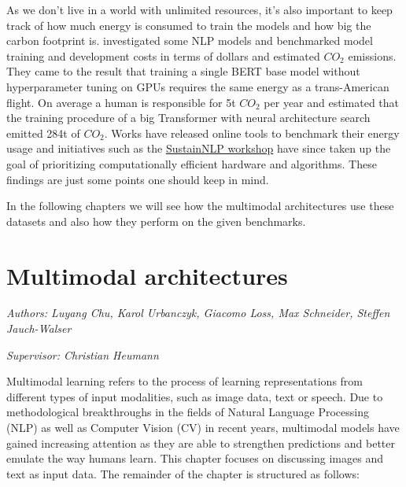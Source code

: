 \documentclass[
]{krantz}
\begin{document}
As we don't live in a world with unlimited resources, it's also important to keep track of how much energy is consumed to train the models and how big the carbon footprint is. \citet{strubell2019energy} investigated some NLP models and benchmarked model training and development costs in terms of dollars and estimated \(CO_2\) emissions. They came to the result that training a single BERT base model without hyperparameter tuning on GPUs requires the same energy as a trans-American flight. On average a human is responsible for 5t \(CO_2\) per year and \citet{strubell2019energy} estimated that the training procedure of a big Transformer with neural architecture search emitted 284t of \(CO_2\). Works \citep[\citet{henderson2020towards}]{lottick2019energy} have released online tools to benchmark their energy usage and initiatives such as the \href{https://sites.google.com/view/sustainlp2020/organization}{SustainNLP workshop} have since taken up the goal of prioritizing computationally efficient hardware and algorithms. These findings are just some points one should keep in mind.

In the following chapters we will see how the multimodal architectures use these datasets and also how they perform on the given benchmarks.

\hypertarget{c02-00-multimodal}{%
\chapter{Multimodal architectures}\label{c02-00-multimodal}}

\emph{Authors: Luyang Chu, Karol Urbanczyk, Giacomo Loss, Max Schneider, Steffen Jauch-Walser}

\emph{Supervisor: Christian Heumann}

Multimodal learning refers to the process of learning representations from different types of input modalities, such as image data, text or speech.
Due to methodological breakthroughs in the fields of Natural Language Processing (NLP) as well as Computer Vision (CV) in recent years, multimodal models have gained increasing attention as they are able to strengthen predictions and better emulate the way humans learn.
This chapter focuses on discussing images and text as input data.
The remainder of the chapter is structured as follows:
\end{document}

